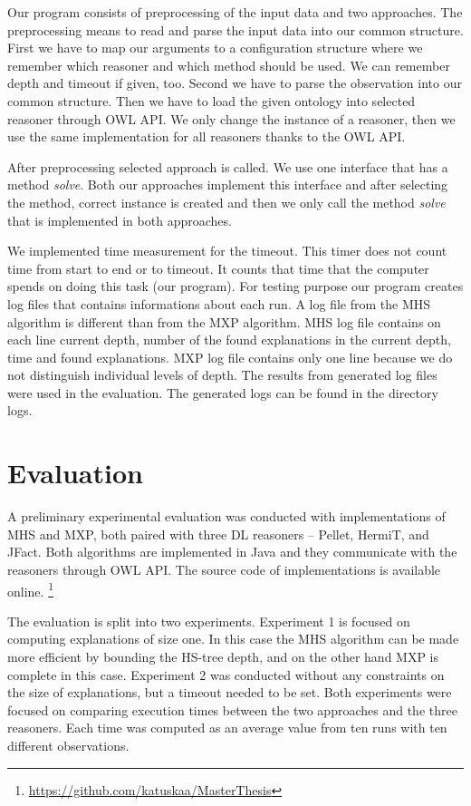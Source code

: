 \documentclass[12pt,a4paper]{article}
\begin{document}
Our program consists of preprocessing of the input data and two approaches. The preprocessing means to read and parse the input data into our common structure. First we have to map our arguments to a configuration structure where we remember which reasoner and which method should be used. We can remember depth and timeout if given, too. Second we have to parse the observation into our common structure. Then we have to load the given ontology into selected reasoner through OWL API. We only change the instance of a reasoner, then we use the same implementation for all reasoners thanks to the OWL API.

After preprocessing selected approach is called. We use one interface that has a method \textit{solve}. Both our approaches implement this interface and after selecting the method, correct instance is created and then we only call the method \textit{solve} that is implemented in both approaches.

We implemented time measurement for the timeout. This timer does not count time from start to end or to timeout. It counts that time that the computer spends on doing this task (our program). For testing purpose our program creates log files that contains informations about each run. A log file from the MHS algorithm is different than from the MXP algorithm. MHS log file contains on each line current depth, number of the found explanations in the current depth, time and found explanations. MXP log file contains only one line because we do not distinguish individual levels of depth. The results from generated log files were used in the evaluation. The generated logs can be found in the directory logs.

\pagebreak
\section{Evaluation}

A preliminary experimental evaluation was conducted with implementations of
MHS and MXP, both paired with three  DL reasoners -- Pellet, HermiT, and
JFact. Both algorithms are implemented in Java and they communicate with the
reasoners through OWL API. The source code of implementations is available online.
\footnote{\url{https://github.com/katuskaa/MasterThesis}}

The evaluation is split into two experiments. Experiment 1 is focused on
computing explanations of size one. In this case the MHS algorithm can be
made more efficient by bounding the HS-tree depth, and on the other hand
MXP is complete in this case. Experiment 2 was conducted without any
constraints on the size of explanations, but a timeout needed to be set. Both
experiments were focused on comparing execution times between the two
approaches and the three reasoners. Each time was computed as an average
value from ten runs with ten different observations.
\end{document}
